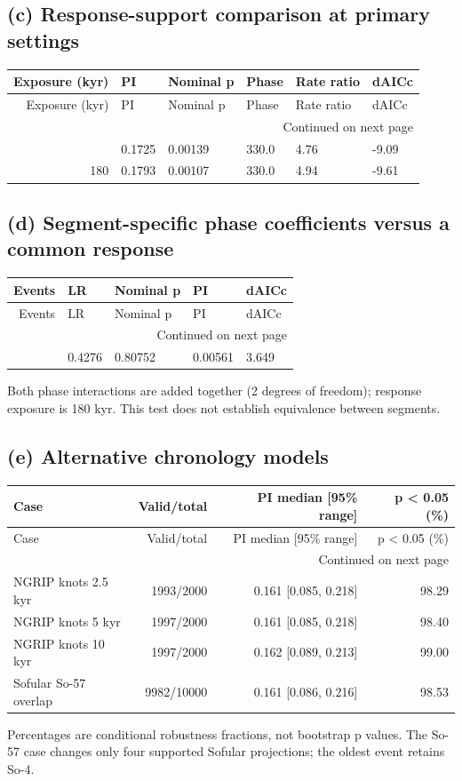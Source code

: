 \subsection*{(c) Response-support comparison at primary settings}
{\small
\begin{longtable}{rlllll}
\toprule
Exposure (kyr) & PI & Nominal p & Phase & Rate ratio & dAICc \\
\midrule
\endfirsthead
\toprule
Exposure (kyr) & PI & Nominal p & Phase & Rate ratio & dAICc \\
\midrule
\endhead
\midrule
\multicolumn{6}{r}{Continued on next page} \\
\midrule
\endfoot
\bottomrule
\endlastfoot
173 & 0.1725 & 0.00139 & 330.0 & 4.76 & -9.09 \\
180 & 0.1793 & 0.00107 & 330.0 & 4.94 & -9.61 \\
\end{longtable}
}
\subsection*{(d) Segment-specific phase coefficients versus a common response}
{\small
\begin{longtable}{rllll}
\toprule
Events & LR & Nominal p & PI & dAICc \\
\midrule
\endfirsthead
\toprule
Events & LR & Nominal p & PI & dAICc \\
\midrule
\endhead
\midrule
\multicolumn{5}{r}{Continued on next page} \\
\midrule
\endfoot
\bottomrule
\endlastfoot
55 & 0.4276 & 0.80752 & 0.00561 & 3.649 \\
\end{longtable}
}
Both phase interactions are added together (2 degrees of freedom); response exposure is 180 kyr. This test does not establish equivalence between segments.
\subsection*{(e) Alternative chronology models}
{\small
\begin{longtable}{lrrr}
\toprule
Case & Valid/total & PI median [95\% range] & p < 0.05 (\%) \\
\midrule
\endfirsthead
\toprule
Case & Valid/total & PI median [95\% range] & p < 0.05 (\%) \\
\midrule
\endhead
\midrule
\multicolumn{4}{r}{Continued on next page} \\
\midrule
\endfoot
\bottomrule
\endlastfoot
NGRIP knots 2.5 kyr & 1993/2000 & 0.161 [0.085, 0.218] & 98.29 \\
NGRIP knots 5 kyr & 1997/2000 & 0.161 [0.085, 0.218] & 98.40 \\
NGRIP knots 10 kyr & 1997/2000 & 0.162 [0.089, 0.213] & 99.00 \\
Sofular So-57 overlap & 9982/10000 & 0.161 [0.086, 0.216] & 98.53 \\
\end{longtable}
}
Percentages are conditional robustness fractions, not bootstrap p values. The So-57 case changes only four supported Sofular projections; the oldest event retains So-4.
